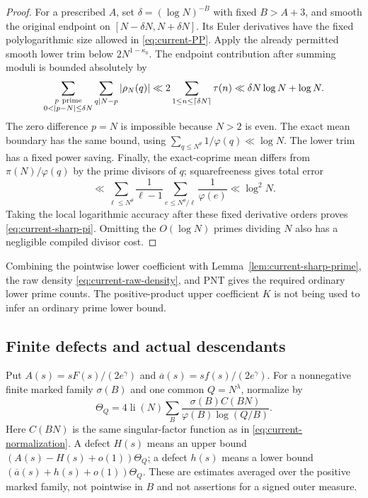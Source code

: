 \begin{proof}
For a prescribed $A$, set $\delta=(\log N)^{-B}$ with fixed
$B>A+3$, and smooth the original endpoint on
$[N-\delta N,N+\delta N]$.  Its Euler derivatives have the fixed
polylogarithmic size allowed in \eqref{eq:current-PP}.  Apply the
already permitted smooth lower trim below $2N^{1-\kappa_0}$.
The endpoint contribution after summing moduli is bounded absolutely by
\[
 \sum_{\substack{p\ {\rm prime}\\0<|p-N|\le\delta N}}
          \sum_{q\mid N-p}|\rho_N(q)|
 \ll 2\sum_{1\le n\le\lceil\delta N\rceil}\tau(n)
 \ll\delta N\log N+\log N.
\]
The zero difference $p=N$ is impossible because $N>2$ is even.
The exact mean boundary has the same bound, using
$\sum_{q\le N^\theta}1/\varphi(q)\ll\log N$.
The lower trim has a fixed power saving.  Finally, the exact-coprime
mean differs from $\pi(N)/\varphi(q)$ by the prime divisors of $q$;
squarefreeness gives total error
\[
 \ll\sum_{\ell\le N^\theta}\frac1{\ell-1}
            \sum_{e\le N^\theta/\ell}\frac1{\varphi(e)}
 \ll\log^2N.
\]
Taking the local logarithmic accuracy after these fixed derivative
orders proves \eqref{eq:current-sharp-pi}.  Omitting the $O(\log N)$
primes dividing $N$ also has a negligible compiled divisor cost.
\end{proof}

Combining the pointwise lower coefficient with
Lemma~\ref{lem:current-sharp-prime}, the raw density
\eqref{eq:current-raw-density}, and PNT gives the required ordinary
lower prime counts.  The positive-product upper coefficient $K$ is
not being used to infer an ordinary prime lower bound.

\subsection{Finite defects and actual descendants}

Put
$A(s)=sF(s)/(2e^\gamma)$ and
$\overline a(s)=sf(s)/(2e^\gamma)$.
For a nonnegative finite marked family $\sigma(B)$ and one common
$Q=N^\lambda$, normalize by
\[
 \Theta_Q=4\operatorname{li}(N)
       \sum_B\frac{\sigma(B)C(BN)}{\varphi(B)\log(Q/B)}.
\]
Here $C(BN)$ is the same singular-factor function as in
\eqref{eq:current-normalization}.  A defect $H(s)$ means an upper
bound $(A(s)-H(s)+o(1))\Theta_Q$; a defect $h(s)$ means a lower
bound $(\overline a(s)+h(s)+o(1))\Theta_Q$.  These are estimates
averaged over the positive marked family, not pointwise in $B$ and
not assertions for a signed outer measure.

